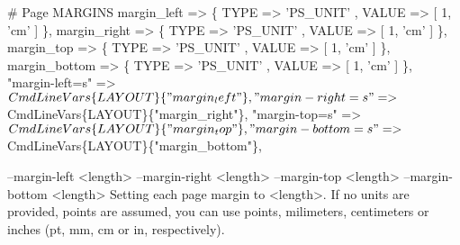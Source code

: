 \documentclass[11pt]{article}
\def\nwendcode{\endtrivlist \endgroup} %
\let\nwdocspar=\par                    %
\begin{document}
\nwenddocs{}\plusendmoddef
# Page MARGINS
margin_left                => \{ TYPE => 'PS_UNIT'  , VALUE => [ 1, 'cm' ] \},
margin_right               => \{ TYPE => 'PS_UNIT'  , VALUE => [ 1, 'cm' ] \},
margin_top                 => \{ TYPE => 'PS_UNIT'  , VALUE => [ 1, 'cm' ] \},
margin_bottom              => \{ TYPE => 'PS_UNIT'  , VALUE => [ 1, 'cm' ] \},
\eatline
{}\nwendcode{}\plusendmoddef
"margin-left=s"         => \\$CmdLineVars\{LAYOUT\}\{"margin_left"\},
"margin-right=s"        => \\$CmdLineVars\{LAYOUT\}\{"margin_right"\},
"margin-top=s"          => \\$CmdLineVars\{LAYOUT\}\{"margin_top"\},
"margin-bottom=s"       => \\$CmdLineVars\{LAYOUT\}\{"margin_bottom"\},
\nwendcode{}\nwdocspar
\nwenddocs{}\plusendmoddef
--margin-left   <length>
--margin-right  <length>
--margin-top    <length>
--margin-bottom <length>
      Setting each page margin to <length>. If no units are provided,
      points are assumed, you can use points, milimeters, centimeters
      or inches (pt, mm, cm or in, respectively).
\nwendcode{}\nwdocspar
\nwenddocs{}\plusendmoddef
\end{document}
